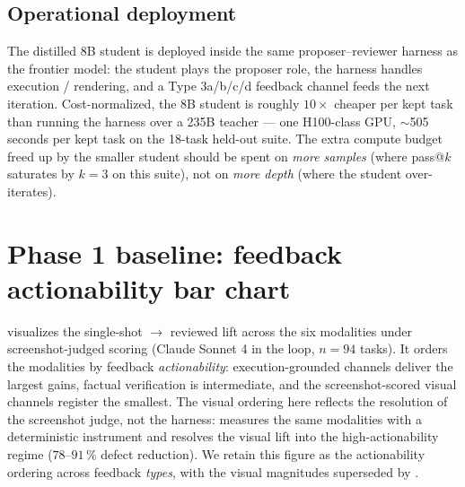 \documentclass[11pt]{article}
\begin{document}
\subsection{Operational deployment}
\label{sec:distill-deploy}

The distilled 8B student is deployed inside the same proposer--reviewer harness as the frontier model: the student plays the proposer role, the harness handles execution / rendering, and a Type 3a/b/c/d feedback channel feeds the next iteration. Cost-normalized, the 8B student is roughly $10\times$ cheaper per kept task than running the harness over a 235B teacher --- one H100-class GPU, $\sim$505 seconds per kept task on the 18-task held-out suite. The extra compute budget freed up by the smaller student should be spent on \emph{more samples} (where pass@$k$ saturates by $k=3$ on this suite), not on \emph{more depth} (where the student over-iterates).






\appendix

\section{Phase 1 baseline: feedback actionability bar chart}
\label{app:phase1}

 visualizes the single-shot $\to$ reviewed lift across the six modalities under screenshot-judged scoring (Claude Sonnet 4 in the loop, $n = 94$ tasks). It orders the modalities by feedback \emph{actionability}: execution-grounded channels deliver the largest gains, factual verification is intermediate, and the screenshot-scored visual channels register the smallest. The visual ordering here reflects the resolution of the screenshot judge, not the harness:  measures the same modalities with a deterministic instrument and resolves the visual lift into the high-actionability regime ($78$--$91\,\%$ defect reduction). We retain this figure as the actionability ordering across feedback \emph{types}, with the visual magnitudes superseded by .
\end{document}
